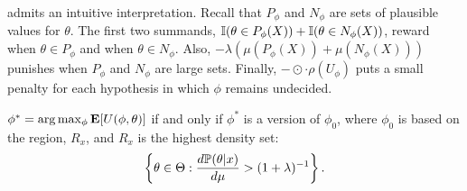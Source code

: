  admits 
an intuitive interpretation.
Recall that $P_{\phi}$ and $N_{\phi}$ are
sets of plausible values for $\theta$.
The first two summands,
$\I(\theta \in P_{\phi}(X)) + 
\I(\theta \in N_{\phi}(X))$, reward
when $\theta \in P_{\phi}$ and
when $\theta \in N_{\phi}$. Also,
$-\lambda \left(\mu(P_{\phi}(X))
  +\mu(N_{\phi}(X)) \right)$ punishes
when $P_{\phi}$ and $N_{\phi}$ are large sets.
Finally, $-\odot \cdot \rho(U_{\phi})$ puts 
a small penalty for each hypothesis
in which $\phi$ remains undecided.

\begin{theorem}
 \label{thm:min_u}
 $\phi^* = \arg \max_{\phi} \E[U(\phi,\theta)]$
 if and only if
 $\phi^*$ is a version of $\phi_0$, where
 $\phi_0$ is based on the region, $R_x$,
 and $R_x$ is
 the highest density set:
 \begin{align*}
  \left\{\theta \in \Theta: 
  \frac{d\P(\theta|x)}{d \mu} 
  > (1+\lambda)^{-1}\right\}.
 \end{align*}
\end{theorem}
